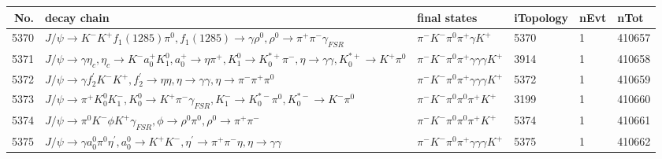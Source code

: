 \begin{table}[htbp] 
\begin{center}
\begin{small}
\begin{tabular}{rlllll}\hline\hline
 No. & decay chain & final states &  iTopology & nEvt & nTot \\\hline
5370&$J/\psi       \rightarrow K^{-}          K^{+}          f_{1}(1285)    \pi^{0}        , f_{1}(1285)     \rightarrow \gamma       \rho^{0}      , \rho^{0}       \rightarrow \pi^{+}        \pi^{-}        \gamma_{FSR} $&$\pi^{-}        K^{-}          \pi^{0}        \pi^{+}        \gamma       K^{+}          $& 5370&    1&410657\\
5371&$J/\psi       \rightarrow \gamma       \eta_{c}    , \eta_{c}     \rightarrow K^{-}          a_{0}^{+}      K_1^{0}        , a_{0}^{+}       \rightarrow \eta          \pi^{+}        , K_1^{0}         \rightarrow K_{0}^{*+}     \pi^{-}        , \eta           \rightarrow \gamma       \gamma       , K_{0}^{*+}      \rightarrow K^{+}          \pi^{0}        $&$\pi^{-}        K^{-}          \pi^{0}        \pi^{+}        \gamma       \gamma       \gamma       K^{+}          $& 3914&    1&410658\\
5372&$J/\psi       \rightarrow \gamma       f_2^{'}       K^{-}          K^{+}          , f_2^{'}        \rightarrow \eta          \eta          , \eta           \rightarrow \gamma       \gamma       , \eta           \rightarrow \pi^{-}        \pi^{+}        \pi^{0}        $&$\pi^{-}        K^{-}          \pi^{0}        \pi^{+}        \gamma       \gamma       \gamma       K^{+}          $& 5372&    1&410659\\
5373&$J/\psi       \rightarrow \pi^{+}        K_0^{0}        K_{1}^{-}      , K_0^{0}         \rightarrow K^{+}          \pi^{-}        \gamma_{FSR} , K_{1}^{-}       \rightarrow K_{0}^{*-}     \pi^{0}        , K_{0}^{*-}      \rightarrow K^{-}          \pi^{0}        $&$\pi^{-}        K^{-}          \pi^{0}        \pi^{0}        \pi^{+}        K^{+}          $& 3199&    1&410660\\
5374&$J/\psi       \rightarrow \pi^{0}        K^{-}          \phi           K^{+}          \gamma_{FSR} , \phi            \rightarrow \rho^{0}      \pi^{0}        , \rho^{0}       \rightarrow \pi^{+}        \pi^{-}        $&$\pi^{-}        K^{-}          \pi^{0}        \pi^{0}        \pi^{+}        K^{+}          $& 5374&    1&410661\\
5375&$J/\psi       \rightarrow \gamma       a_{0}^{0}      \pi^{0}        \eta^{\prime} , a_{0}^{0}       \rightarrow K^{+}          K^{-}          , \eta^{\prime}  \rightarrow \pi^{+}        \pi^{-}        \eta          , \eta           \rightarrow \gamma       \gamma       $&$\pi^{-}        K^{-}          \pi^{0}        \pi^{+}        \gamma       \gamma       \gamma       K^{+}          $& 5375&    1&410662\\

\end{tabular}
\end{small}
\end{center}
\end{table}
